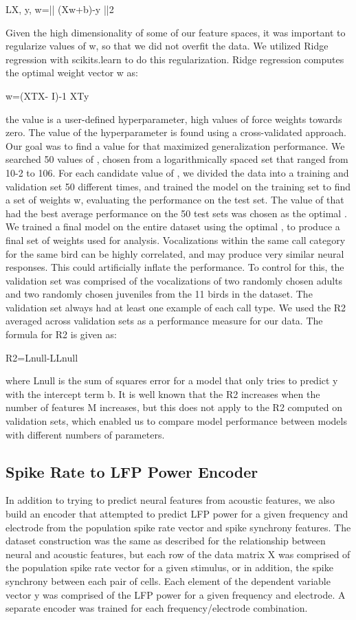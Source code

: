 LX, y, w=|| (Xw+b)-y ||2

Given the high dimensionality of some of our feature spaces, it was important to regularize values of w, so that we did not overfit the data. We utilized Ridge regression with scikits.learn to do this regularization. Ridge regression computes the optimal weight vector w as:

w=(XTX- I)-1 XTy

the value is a user-defined hyperparameter, high values of force weights towards zero.
The value of the hyperparameter  is found using a cross-validated approach. Our goal was to find a value for that maximized generalization performance. We searched 50 values of , chosen from a logarithmically spaced set that ranged from 10-2 to 106. For each candidate value of , we divided the data into a training and validation set 50 different times, and trained the model on the training set to find a set of weights w, evaluating the performance on the test set. The value of  that had the best average performance on the 50 test sets was chosen as the optimal . We trained a final model on the entire dataset using the optimal , to produce a final set of weights used for analysis.
Vocalizations within the same call category for the same bird can be highly correlated, and may produce very similar neural responses. This could artificially inflate the performance. To control for this, the validation set was comprised of the vocalizations of two randomly chosen adults and two randomly chosen juveniles from the 11 birds in the dataset. The validation set always had at least one example of each call type.
We used the R2 averaged across validation sets as a performance measure for our data. The formula for R2 is given as:

R2=Lnull-LLnull

where Lnull is the sum of squares error for a model that only tries to predict y with the intercept term b. It is well known that the R2 increases when the number of features M increases, but this does not apply to the R2 computed on validation sets, which enabled us to compare model performance between models with different numbers of parameters.

\subsection{Spike Rate to LFP Power Encoder}

In addition to trying to predict neural features from acoustic features, we also build an encoder that attempted to predict LFP power for a given frequency and electrode from the population spike rate vector and spike synchrony features. The dataset construction was the same as described for the relationship between neural and acoustic features, but each row of the data matrix X was comprised of the population spike rate vector for a given stimulus, or in addition, the spike synchrony between each pair of cells. Each element of the dependent variable vector y was comprised of the LFP power for a given frequency and electrode. A separate encoder was trained for each frequency/electrode combination.

